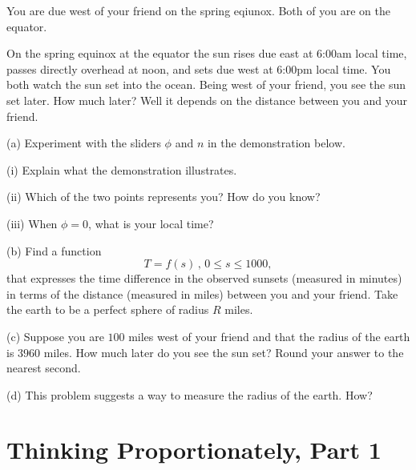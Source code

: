 \documentclass{ximera}
\begin{document}
\begin{question} \label{Q793:Angles}
You are due west of your friend on the spring eqiunox. Both of you are on the equator. 

On the spring equinox at the equator the sun rises due east at 6:00am local time, passes directly overhead at noon, and sets due west at 6:00pm local time. You both watch the sun set into the ocean. Being west of your friend, you see the sun set later. How much later? Well it depends on the distance between you and your friend.

(a) Experiment with the sliders $\phi$ and $n$ in the demonstration below.

(i) Explain what the demonstration illustrates.

(ii) Which of the two points represents you? How do you know?

(iii) When $\phi=0$, what is your local time? 

 
\begin{onlineOnly}
    \begin{center}
\end{center}
\end{onlineOnly}



(b) Find a function 
\[
   T = f(s) \, , \, 0\leq s \leq 1000 ,
\]
that expresses the time difference in the observed sunsets (measured in minutes) in terms of the distance (measured in miles) between you and your friend. Take the earth to be a perfect sphere of radius $R$ miles.

(c) Suppose you are $100$ miles west of your friend and that the radius of the earth is $3960$ miles. How much later do you see the sun set? Round your answer to the nearest second.

(d) This problem suggests a way to measure the radius of the earth. How?

\end{question}



\section{Thinking Proportionately, Part 1}
\end{document}
